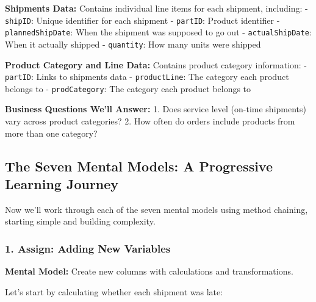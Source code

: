 \documentclass[
]{article}
\begin{document}
\begin{tcolorbox}[enhanced jigsaw, colbacktitle=quarto-callout-note-color!10!white, toptitle=1mm, colframe=quarto-callout-note-color-frame, bottomtitle=1mm, colback=white, left=2mm, breakable, coltitle=black, bottomrule=.15mm, rightrule=.15mm, titlerule=0mm, opacityback=0, title=\textcolor{quarto-callout-note-color}{\faInfo}\hspace{0.5em}{💡 Understanding the Data}, arc=.35mm, opacitybacktitle=0.6, toprule=.15mm, leftrule=.75mm]

\textbf{Shipments Data:} Contains individual line items for each
shipment, including: - \texttt{shipID}: Unique identifier for each
shipment - \texttt{partID}: Product identifier -
\texttt{plannedShipDate}: When the shipment was supposed to go out -
\texttt{actualShipDate}: When it actually shipped - \texttt{quantity}:
How many units were shipped

\textbf{Product Category and Line Data:} Contains product category
information: - \texttt{partID}: Links to shipments data -
\texttt{productLine}: The category each product belongs to -
\texttt{prodCategory}: The category each product belongs to

\textbf{Business Questions We'll Answer:} 1. Does service level (on-time
shipments) vary across product categories? 2. How often do orders
include products from more than one category?

\end{tcolorbox}

\subsection{The Seven Mental Models: A Progressive Learning
Journey}\label{the-seven-mental-models-a-progressive-learning-journey}

Now we'll work through each of the seven mental models using method
chaining, starting simple and building complexity.

\subsubsection{1. Assign: Adding New
Variables}\label{assign-adding-new-variables}

\textbf{Mental Model:} Create new columns with calculations and
transformations.

Let's start by calculating whether each shipment was late:
\end{document}
